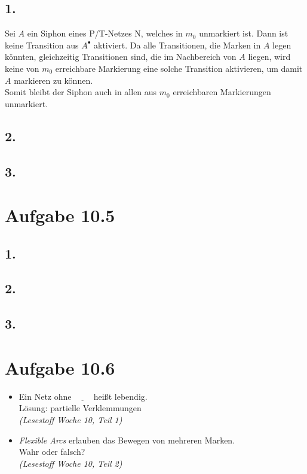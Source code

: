 \documentclass[12pt, paper=a4]{article}
\begin{document}
\subsection*{1.}
Sei \(A\) ein Siphon eines P/T-Netzes N, welches in \(m_0\) unmarkiert ist. Dann ist keine Transition aus \(A^{\bullet}\) aktiviert. Da alle Transitionen, die Marken in \(A\) legen k\"onnten, gleichzeitig Transitionen sind, die im Nachbereich von  \(A\) liegen, wird keine von \(m_0\) erreichbare Markierung eine solche Transition aktivieren, um damit \(A\) markieren zu k\"onnen.\\
Somit bleibt der Siphon auch in allen aus \(m_0\) erreichbaren Markierungen unmarkiert.

\subsection*{2.}
\subsection*{3.}


\section*{Aufgabe 10.5}
\subsection*{1.}
\subsection*{2.}
\subsection*{3.}

\section*{Aufgabe 10.6}
\begin{itemize}
	\item Ein Netz ohne \(\underline{\qquad}\) hei{\ss}t lebendig.\\
		L\"osung: partielle Verklemmungen\\
		\textit{(Lesestoff Woche 10, Teil 1)}
	\item \textit{Flexible Arcs} erlauben das Bewegen von mehreren Marken.\\
		Wahr oder falsch?\\
		\textit{(Lesestoff Woche 10, Teil 2)}
\end{itemize}
\end{document}
